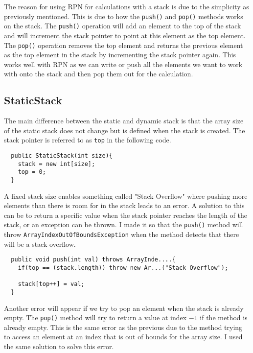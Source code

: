 \documentclass[a4paper,11pt]{article}
\begin{document}
The reason for using RPN for calculations with a stack is due to the
simplicity as previously mentioned. This is due to how the {\tt push()} 
and {\tt pop()} methods works on the stack. The {\tt push()} operation
will add an element to the top of the stack and will increment the
stack pointer to point at this element as the top element. The 
{\tt pop()} operation removes the top element and returns the previous
element as the top element in the stack by incrementing the stack
pointer again. This works well with RPN as we can write or push all
the elements we want to work with onto the stack and then pop them
out for the calculation. 

\subsection*{StaticStack}

The main difference between the static and dynamic stack is that
the array size of the static stack does not change but is defined
when the stack is created. The stack pointer is referred to as 
{\tt top} in the following code.

\begin{verbatim}
  public StaticStack(int size){
    stack = new int[size];
    top = 0;
  }
\end{verbatim}

A fixed stack size enables something called "Stack Overflow" where 
pushing more elements than there is room for in the stack leads to 
an error. A solution to this can be to return a specific value when 
the stack pointer reaches the length of the stack, or an exception
can be thrown. I made it so that the {\tt push()} method will throw
{\tt ArrayIndexOutOfBoundsException} when the method detects that
there will be a stack overflow.

\begin{verbatim}
  public void push(int val) throws ArrayInde....{
    if(top == (stack.length)) throw new Ar...("Stack Overflow");
    
    stack[top++] = val;
  }
\end{verbatim}

Another error will appear if we try to pop an element when the stack
is already empty. The {\tt pop()} method will try to return a value 
at index $ -1$ if the method is already empty. This is the same error
as the previous due to the method trying to access an element at an 
index that is out of bounds for the array size. I used the same 
solution to solve this error.
\end{document}
